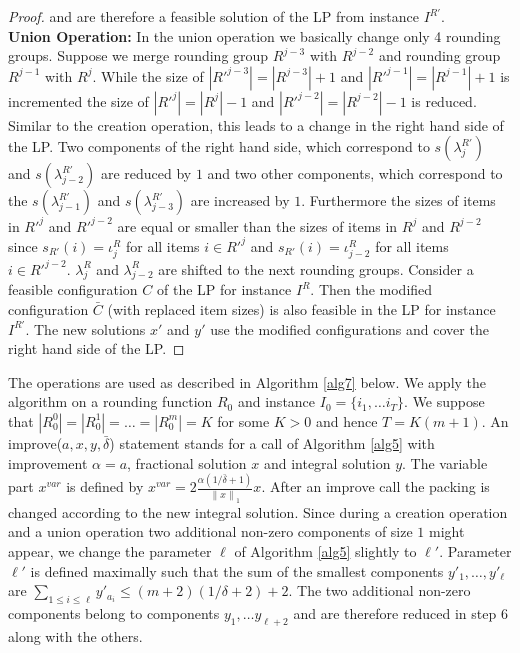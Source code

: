 \documentclass[a4paper,11pt]{article}
\newcommand{\nor}[1]{\left\|#1\right\|}
\begin{document}
\begin{proof}
	and are therefore a feasible solution of the LP from instance $I^{R'}$.\\
	{\bf Union Operation:}
	In the union operation we basically change only 4 rounding groups. Suppose we merge rounding group $R^{j-3}$ with
	$R^{j-2}$ and rounding group $R^{j-1}$ with $R^{j}$. While the size of $|R'^{j-3}| = |R^{j-3}|+1$ and 
	$|R'^{j-1}| = |R^{j-1}|+1$ is incremented the size of $|R'^{j}| = |R^{j}|-1$ and $|R'^{j-2}| = |R^{j-2}|-1$
	is reduced. Similar to the creation operation, this leads to a change in the right
	hand side of the LP. Two components of the right hand side, which correspond to $s(\lambda_{j}^{R'})$
	and $s(\lambda_{j-2}^{R'})$ are reduced by $1$ and two other components, which correspond to the 
	$s(\lambda_{j-1}^{R'})$ and $s(\lambda_{j-3}^{R'})$ are increased by $1$.
	Furthermore the sizes of items in $R'^{j}$ and $R'^{j-2}$ are equal or smaller than the sizes of
	items in $R^j$ and $R^{j-2}$ since $s_{R'}(i) = \iota_{j}^R$
	for all items $i \in R'^{j}$ and $s_{R'}(i) = \iota_{j-2}^R$ for all items $i \in R'^{j-2}$.
	 $\lambda_{j}^R$
	and $\lambda_{j-2}^{R}$ are shifted to the next rounding groups. 
	Consider a feasible configuration $C$ of the LP for instance $I^R$. Then the modified configuration $\bar{C}$
	(with replaced item sizes) is also feasible in the LP for instance $I^{R'}$. The new solutions $x'$ and $y'$ use
	the modified configurations and cover the right hand side of the LP.
\end{proof}
The operations are used as described in Algorithm \ref{alg7} below. We apply the algorithm on a rounding function
$R_0$ and instance $I_0 = \{i_1, \ldots i_{T} \}$. We suppose that $|R_{0}^0| = |R_{0}^1| = \ldots = |R_{0}^m| = K$
for some $K >0$ and hence $T = K(m+1)$.
An improve($a,x,y,\bar{\delta}$) statement stands for a call of Algorithm \ref{alg5} 
with improvement $\alpha= a$, fractional solution $x$ and integral solution $y$. The variable part $x^{var}$ 
is defined by $x^{var} = 2 
\frac{\alpha(1/ \bar{\delta} +1)}{\nor{x}_1}x$. 
After an improve call the packing is changed according to the new integral solution.
Since during a creation operation and a union operation two additional non-zero components of size $1$ might appear,
we change the parameter $\ell$ of Algorithm \ref{alg5} slightly to $\ell'$. Parameter $\ell'$ is defined maximally such that
the sum of the smallest components $y'_1, \ldots , y'_{\ell}$ are 
$\sum_{1\leq i \leq \ell} y'_{a_i} \leq (m+2)(1/ \delta +2) +2$. The two additional non-zero components belong to
components $y_1 , \ldots y_{\ell +2}$ and are therefore reduced in step 6 along with the others.
\end{document}
